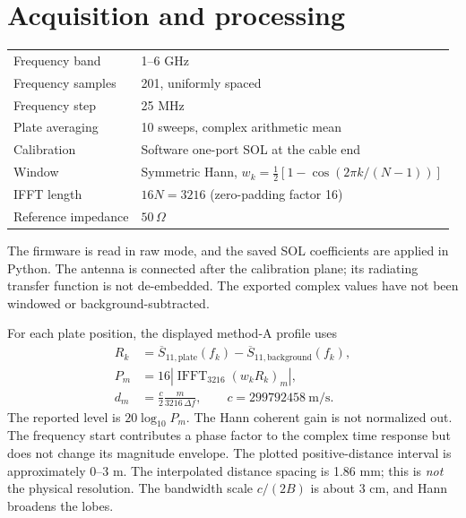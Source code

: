 \documentclass[11pt,a4paper]{article}
\begin{document}
\section{Acquisition and processing}
\begin{center}
\begin{tabular}{ll}
\toprule
Frequency band & 1--6 GHz\\
Frequency samples & 201, uniformly spaced\\
Frequency step & 25 MHz\\
Plate averaging & 10 sweeps, complex arithmetic mean\\
Calibration & Software one-port SOL at the cable end\\
Window & Symmetric Hann, $w_k=\tfrac12[1-\cos(2\pi k/(N-1))]$\\
IFFT length & $16N=3216$ (zero-padding factor 16)\\
Reference impedance & $50\,\Omega$\\
\bottomrule
\end{tabular}
\end{center}
The firmware is read in raw mode, and the saved SOL coefficients are applied
in Python. The antenna is connected after the calibration plane; its radiating
transfer function is not de-embedded. The exported complex values have not been
windowed or background-subtracted.

For each plate position, the displayed method-A profile uses
\begin{align}
 R_k &= \overline{S}_{11,\mathrm{plate}}(f_k)
        -\overline{S}_{11,\mathrm{background}}(f_k),\\
 P_m &=16\left|\operatorname{IFFT}_{3216}(w_k R_k)_m\right|,\\
 d_m &=\frac{c}{2}\frac{m}{3216\,\Delta f},\qquad c=299792458\ \mathrm{m/s}.
\end{align}
The reported level is $20\log_{10}P_m$. The Hann coherent gain is not
normalized out. The frequency start contributes a phase factor to the complex
time response but does not change its magnitude envelope. The plotted
positive-distance interval is approximately 0--3 m.
The interpolated distance spacing is 1.86 mm; this is \emph{not} the physical
resolution. The bandwidth scale $c/(2B)$ is about 3 cm, and Hann broadens the lobes.
\end{document}
